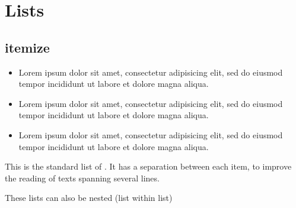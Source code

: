 %
\section{Lists}
\subsection{itemize}

\begin{filecontents*}{\democodefile}
\begin{itemize}
   \item Lorem ipsum dolor sit amet, consectetur adipisicing elit, sed do
   eiusmod tempor incididunt ut labore et dolore magna aliqua.
%
   \item Lorem ipsum dolor sit amet, consectetur adipisicing elit, sed do
   eiusmod tempor incididunt ut labore et dolore magna aliqua.
%
   \item Lorem ipsum dolor sit amet, consectetur adipisicing elit, sed do
   eiusmod tempor incididunt ut labore et dolore magna aliqua.
\end{itemize}
\end{filecontents*}

This is the standard list of \latex{}. It has a separation between each item, to improve the reading of texts spanning several lines.

%
These lists can also be nested (list within list)

